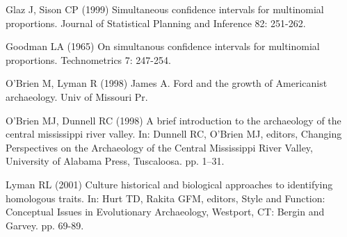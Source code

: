 \documentclass[10pt,letterpaper]{article}
\begin{document}
\begin{thebibliography}{10}
Glaz J, Sison CP (1999) Simultaneous confidence intervals for multinomial
  proportions.
\newblock Journal of Statistical Planning and Inference 82: 251-262.

Goodman LA (1965) On simultanous confidence intervals for multinomial
  proportions.
\newblock Technometrics 7: 247-254.

O'Brien M, Lyman R (1998) James A. Ford and the growth of Americanist
  archaeology.
\newblock Univ of Missouri Pr.

O'Brien MJ, Dunnell RC (1998) A brief introduction to the archaeology of the
  central mississippi river valley.
\newblock In: Dunnell RC, O'Brien MJ, editors, Changing Perspectives on the
  Archaeology of the Central Mississippi River Valley, University of Alabama
  Press, Tuscaloosa. pp. 1--31.

Lyman RL (2001) Culture historical and biological approaches to identifying
  homologous traits.
\newblock In: Hurt TD, Rakita GFM, editors, Style and Function: Conceptual
  Issues in Evolutionary Archaeology, Westport, CT: Bergin and Garvey. pp.
  69-89.

\end{thebibliography}
\end{document}
